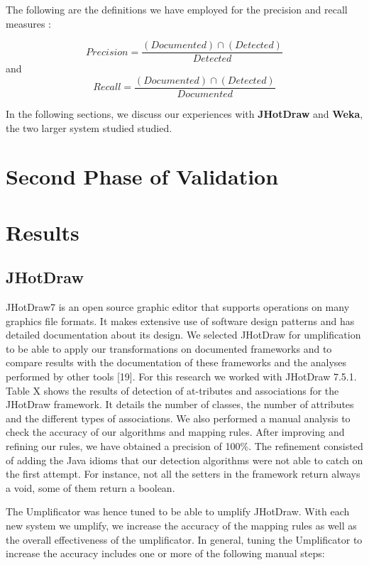 The following are the definitions we have employed for the precision and recall measures \cite{precisionRecallDef}:

\[  Precision=\frac{(Documented) \cap  (Detected)}{Detected}\]
and \\
\[  Recall=\frac{(Documented) \cap (Detected)}{Documented} \]

 
 In the following sections, we  discuss our experiences with \textbf{JHotDraw} and \textbf{Weka}, the two larger system studied studied.

\section{Second Phase of Validation}

\section{Results}

\subsection{JHotDraw}
 
JHotDraw7 \cite{jhotdraw} is an open source graphic editor that supports operations on many graphics file formats. It makes extensive use of software design patterns and has detailed documentation about its design. We selected JHotDraw for umplification to be able to apply our transformations on documented frameworks and to compare results with the documentation of these frameworks and the analyses performed by other tools [19]. For this research we worked with JHotDraw 7.5.1.
Table X shows the results of detection of at-tributes and associations for the JHotDraw framework. It details the number of classes, the number of attributes and the different types of associations. We also performed a manual analysis to check the accuracy of our algorithms and mapping rules. After improving and refining our rules, we have obtained a precision of 100\%. The refinement consisted of adding the Java idioms that our detection algorithms were not able to catch on the first attempt. For instance, not all the setters in the framework return always a void, some of them return a boolean.

The Umplificator was hence tuned to be able to umplify JHotDraw. With each new system we umplify, we increase the accuracy of the mapping rules as well as the overall effectiveness of the umplificator. In general, tuning the Umplificator to increase the accuracy includes one or more of the following manual steps:

